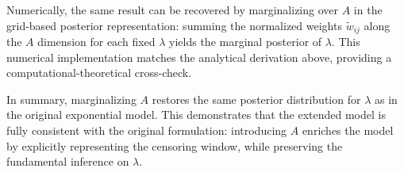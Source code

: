 Numerically, the same result can be recovered by marginalizing over $A$ in the grid-based posterior representation: summing the normalized weights $\tilde w_{ij}$ along the $A$ dimension for each fixed $\lambda$ yields the marginal posterior of $\lambda$. This numerical implementation matches the analytical derivation above, providing a computational-theoretical cross-check.

In summary, marginalizing $A$ restores the same posterior distribution for $\lambda$ as in the original exponential model. This demonstrates that the extended model is fully consistent with the original formulation: introducing $A$ enriches the model by explicitly representing the censoring window, while preserving the fundamental inference on $\lambda$.